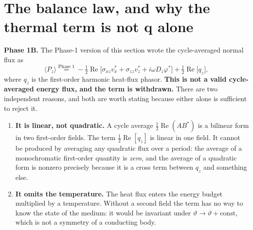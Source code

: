 \documentclass[11pt]{article}
\newcommand{\s}{\sigma}
\newcommand{\bth}{\vartheta}
\theoremstyle{plain}
\begin{document}
\section{The balance law, and why the thermal term is not $\bm{q}$ alone}
\label{sec:balance-law}

\textbf{Phase 1B.} The Phase-1 version of this section wrote the cycle-averaged
normal flux as
\begin{equation}
  \langle P_z\rangle \overset{\text{Phase 1}}{=}
  -\tfrac12\operatorname{Re}\big[\s_{xz}v_x^*+\s_{zz}v_z^*
  +i\omega D_z\varphi^*\big] + \tfrac12\operatorname{Re}\big[q_z\big],
  \label{eq:phase1-wrong}
\end{equation}
where $q_z$ is the first-order harmonic heat-flux phasor. \textbf{This is not a
valid cycle-averaged energy flux, and the term is withdrawn.} There are two
independent reasons, and both are worth stating because either alone is
sufficient to reject it.

\begin{enumerate}
  \item \textbf{It is linear, not quadratic.} A cycle average
        $\tfrac12\operatorname{Re}(AB^*)$ is a bilinear form in two first-order
        fields. The term $\tfrac12\operatorname{Re}[q_z]$ is linear in one
        field. It cannot be produced by averaging any quadratic flux over a
        period: the average of a monochromatic first-order quantity is
        \emph{zero}, and the average of a quadratic form is nonzero precisely
        because it is a cross term between $q_z$ and something else.
  \item \textbf{It omits the temperature.} The heat flux enters the energy
        budget multiplied by a temperature. Without a second field the term has
        no way to know the state of the medium: it would be invariant under
        $\bth\to\bth+\text{const}$, which is not a symmetry of a conducting body.
\end{enumerate}
\end{document}
